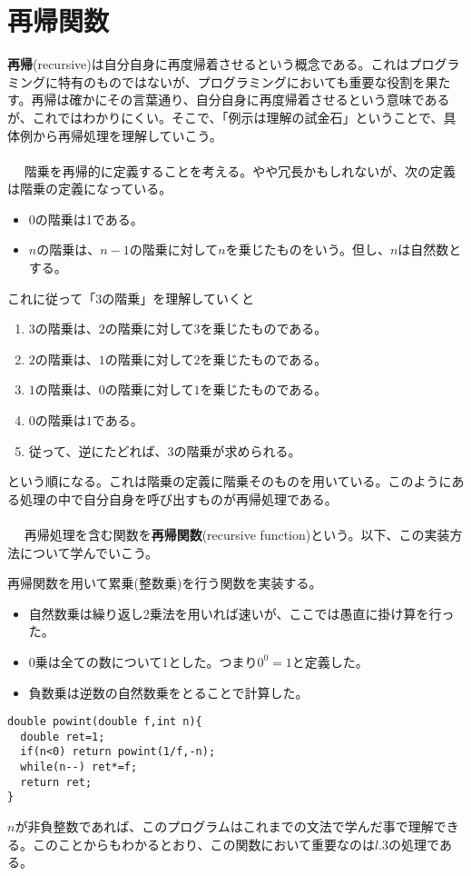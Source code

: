 \section{再帰関数}
\textbf{再帰}(recursive)は自分自身に再度帰着させるという概念である。これはプログラミングに特有のものではないが、プログラミングにおいても重要な役割を果たす。再帰は確かにその言葉通り、自分自身に再度帰着させるという意味であるが、これではわかりにくい。そこで、「例示は理解の試金石」ということで、具体例から再帰処理を理解していこう。
\\ \\　
階乗を再帰的に定義することを考える。やや冗長かもしれないが、次の定義は階乗の定義になっている。
\begin{itemize}
\item 0の階乗は1である。
\item $n$の階乗は、$n-1$の階乗に対して$n$を乗じたものをいう。但し、$n$は自然数とする。
\end{itemize}
これに従って「$3$の階乗」を理解していくと
\begin{enumerate}
\item $3$の階乗は、$2$の階乗に対して$3$を乗じたものである。
\item $2$の階乗は、$1$の階乗に対して$2$を乗じたものである。
\item $1$の階乗は、$0$の階乗に対して$1$を乗じたものである。
\item $0$の階乗は$1$である。
\item 従って、逆にたどれば、3の階乗が求められる。
\end{enumerate}
という順になる。これは階乗の定義に階乗そのものを用いている。このようにある処理の中で自分自身を呼び出すものが再帰処理である。
\\ \\　
再帰処理を含む関数を\textbf{再帰関数}(recursive function)という。以下、この実装方法について学んでいこう。
\begin{boxnote}
\begin{multicols}{2}
再帰関数を用いて累乗(整数乗)を行う関数を実装する。
\begin{itemize}
\item 自然数乗は繰り返し2乗法を用いれば速いが、ここでは愚直に掛け算を行った。
\item 0乗は全ての数について1とした。つまり$0^0=1$と定義した。
\item 負数乗は逆数の自然数乗をとることで計算した。
\end{itemize}
\begin{lstlisting}[caption=整数乗を行う関数,label=program7_5]
double powint(double f,int n){
  double ret=1;
  if(n<0) return powint(1/f,-n);
  while(n--) ret*=f;
  return ret;
}
\end{lstlisting}
\end{multicols}
\end{boxnote}
$n$が非負整数であれば、このプログラムはこれまでの文法で学んだ事で理解できる。このことからもわかるとおり、この関数において重要なのは$l$.3の処理である。

